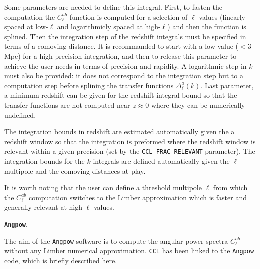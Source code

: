 \documentclass[\docopts]{\docclass}
\newcommand{\ccl}{{\tt CCL}\xspace}
\begin{document}
Some parameters are needed to define this integral. First, to fasten the computation the $C^{ab}_\ell$ function is computed for a selection of $\ell$ values (linearly spaced at low-$\ell$ and logarithmicly spaced at high-$\ell$) and then the function is splined. Then the integration step of the redshift integrals must be specified in terms of a comoving distance. It is recommanded to start with a low value ($<3$\,Mpc) for a high precision integration, and then to release this parameter to achieve the user needs in terms of precision and rapidity. A logarithmic step in $k$ must also be provided: it does not correspond to the integration step but to a computation step before splining the transfer functions $\Delta^a_\ell(k)$. Last parameter, a minimum redshift can be given for the redshift integral bound so that the transfer functions are not computed near $z\approx 0$ where they can be numerically undefined.

The integration bounds in redshift are estimated automatically given the a redshift window so that the integration is preformed where the redshift window is relevant within a given precision (set by the \texttt{CCL\_FRAC\_RELEVANT} parameter). The integration bounds for the $k$ integrals are defined automatically given the $\ell$ multipole and the comoving distances at play.

It is worth noting that the user can define a threshold multipole $\ell$ from which the $C^{ab}_\ell$ computation switches to the Limber approximation which is faster and generally relevant at high $\ell$ values. 

{\texttt{\bf Angpow}.}

The aim of the \texttt{Angpow} software \citep{2017arXiv170103592C} is to compute the angular power spectra  $C_{\ell}^{ab}$  without any Limber numerical approximation. \ccl has been linked to the \texttt{Angpow} code,  which is briefly described here.
\end{document}
